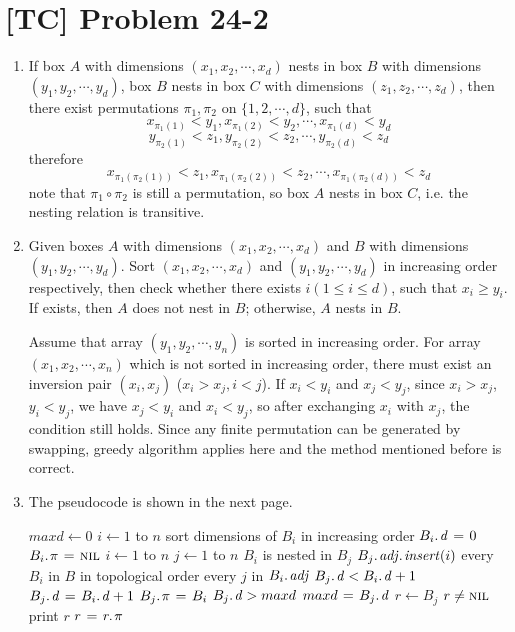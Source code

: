 \documentclass[a4paper,11pt,twocolumn]{article}
\newcommand{\NIL}{\const{nil}}
\begin{document}
  \section{[TC] Problem 24-2}
  \begin{enumerate}
  \item If box $A$ with dimensions $(x_1, x_2, \cdots, x_d)$ nests in box $B$ with dimensions $(y_1, y_2, \cdots, y_d)$, box $B$ nests in box $C$ with dimensions $(z_1, z_2, \cdots, z_d)$, then there exist permutations $\pi_1, \pi_2$ on $\{1, 2, \cdots, d\}$, such that
  $$ x_{\pi_1(1)} < y_1, x_{\pi_1(2)} < y_2, \cdots, x_{\pi_1(d)} < y_d $$
  $$ y_{\pi_2(1)} < z_1, y_{\pi_2(2)} < z_2, \cdots, y_{\pi_2(d)} < z_d $$
  therefore
  $$ x_{\pi_1(\pi_2(1))} < z_1, x_{\pi_1(\pi_2(2))} < z_2, \cdots, x_{\pi_1(\pi_2(d))} < z_d $$
  note that $\pi_1 \circ \pi_2$ is still a permutation, so box $A$ nests in box $C$, i.e. the nesting relation is transitive.
  \item Given boxes $A$ with dimensions $(x_1, x_2, \cdots, x_d)$ and $B$ with dimensions $(y_1, y_2, \cdots, y_d)$. Sort $(x_1, x_2, \cdots, x_d)$ and $(y_1, y_2, \cdots, y_d)$ in increasing order respectively, then check whether there exists $i (1 \leq i \leq d)$, such that $x_i \geq y_i$. If exists, then $A$ does not nest in $B$; otherwise, $A$ nests in $B$. \par
  Assume that array $(y_1, y_2, \cdots, y_n)$ is sorted in increasing order. For array $(x_1, x_2, \cdots, x_n)$ which is not sorted in increasing order, there must exist an inversion pair $(x_i, x_j)$ ($x_i>x_j, i<j$). If $x_i < y_i$ and $x_j < y_j$, since $x_i > x_j$, $y_i < y_j$, we have $x_j < y_i$ and $x_i < y_j$, so after exchanging $x_i$ with $x_j$, the condition still holds. Since any finite permutation can be generated by swapping, greedy algorithm applies here and the method mentioned before is correct.
  \item The pseudocode is shown in the next page.
  \begin{codebox}
  \li $maxd \gets 0$
  \li \For $i \gets 1$ to $n$
  \li \Do  sort dimensions of $B_i$ in increasing order
  \li      $\attrib{B_i}{d} \gets 0$
  \li      $\attrib{B_i}{\pi} \gets \NIL$
      \End
  \li \For $i \gets 1$ to $n$
  \li \Do  \For $j \gets 1$ to $n$
  \li      \Do  \If $B_i$ is nested in $B_j$
  \li           \Do $\attribb{B_j}{adj}{insert}(i)$
                \End
           \End
      \End
  \li \For every $B_i$ in $B$ in topological order
  \li \Do  \For every $j$ in $\attrib{B_i}{adj}$
  \li      \If  $\attrib{B_j}{d} < \attrib{B_i}{d} + 1$
  \li      \Do  $\attrib{B_j}{d} \gets \attrib{B_i}{d} + 1$
  \li           $\attrib{B_j}{\pi} \gets B_i$
  \li           \If $\attrib{B_j}{d} > maxd$
  \li           \Do $maxd \gets \attrib{B_j}{d}$
  \li               $r \gets B_j$
                \End
           \End
      \End
  \li \While $r \neq \NIL$
  \li \Do print $r$
  \li     $r \gets \attrib{r}{\pi}$
      \End
  \end{codebox}


\end{enumerate}
\end{document}
